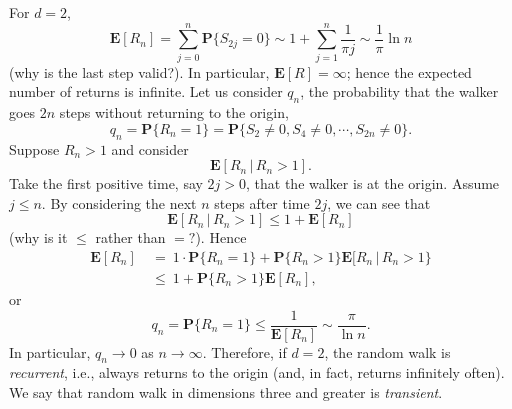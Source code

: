 \documentclass{stml-l}
\theoremstyle{definition}
\numberwithin{equation}{chapter}
\numberwithin{figure}{chapter}
\numberwithin{figure}{section}
\begin{document}
For $d=2$,
\begin{equation*}
\mathbf{E}[R_{n}]=\sum\limits_{j=0}^{n}\mathbf{P}\{S_{2j}=0\}\sim
1+\sum\limits_{j=1}^{n}\frac{1}{\pi j}\sim\frac{1}{\pi}\ln n
\end{equation*}
(why is the last step valid?). In particular,
$\mathbf{E}[R]=\infty$; hence the expected number of returns is
infinite. Let us consider $q_{n}$, the probability that the walker
goes $2n$ steps without returning to the origin,
\begin{equation*}
q_{n}=\mathbf{P}\{R_{n}=1\}=\mathbf{P}\{S_{2}\neq 0,S_{4}\neq
0,\cdots,S_{2n}\neq 0\}.
\end{equation*}
Suppose $R_{n}>1$ and consider
\begin{equation*}
\mathbf{E}[R_{n}\,|\,R_{n}>1].
\end{equation*}
Take the first positive time, say $2j>0$, that the walker is at the
origin. Assume $j\leq n$. By considering the next $n$ steps after
time $2j$, we can see that
\begin{equation*}
\mathbf{E}[R_{n}\,|\,R_{n}>1]\leq 1+\mathbf{E}[R_{n}]
\end{equation*}
(why is it $\leq$ rather than $=?$). Hence
\begin{align*}
\mathbf{E}[R_{n}]\ &=\ 1\cdot
\mathbf{P}\{R_{n}=1\}+\mathbf{P}\{R_{n}>1\}\mathbf{E}[R_{n}\,|\,R_{n}>1\}\\
&\leq\ 1+\mathbf{P}\{R_{n}>1\}\mathbf{E}[R_{n}],
\end{align*}
or
\begin{equation*}
q_{n}=\mathbf{P}\{R_{n}=1\}\leq\frac{1}{\mathbf{E}[R_{n}]}\sim\frac{\pi}{\ln
n}.
\end{equation*}
In particular, $q_{n}\rightarrow 0$ as $ n\rightarrow\infty$.
Therefore, if $d=2$, the random walk is \emph{recurrent}, i.e.,
always returns to the origin (and, in fact, returns infinitely
often). We say that random walk in dimensions three and greater is
\emph{transient}.
\end{document}

